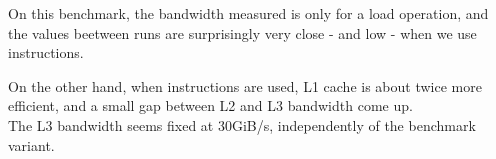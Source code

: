 
On this benchmark, the bandwidth measured is only for a load operation, and the values beetween runs are surprisingly very close - and low - when we use  instructions.

On the other hand, when  instructions are used, L1 cache is about twice more efficient, and a small gap between L2 and L3 bandwidth come up.\\

The L3 bandwidth seems fixed at 30GiB/s, independently of the benchmark variant.